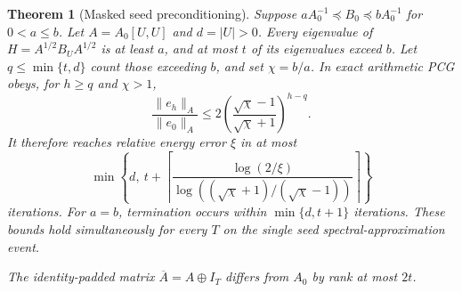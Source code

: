 \documentclass[11pt]{article}
\newtheorem{theorem}{Theorem}
\begin{document}
\begin{theorem}[Masked seed preconditioning]\label{thm:seedpcg}
Suppose $aA_0^{-1}\preceq B_0\preceq bA_0^{-1}$ for $0<a\leq b$.
Let $A=A_0[U,U]$ and $d=|U|>0$. Every eigenvalue of
$H=A^{1/2}B_UA^{1/2}$ is at least $a$, and at most $t$ of its
eigenvalues exceed $b$. Let $q\leq\min\{t,d\}$ count those
exceeding $b$, and set $\chi=b/a$. In exact arithmetic PCG obeys,
for $h\geq q$ and $\chi>1$,
\[
 \frac{\|e_h\|_A}{\|e_0\|_A}
 \leq 2\left(\frac{\sqrt\chi-1}{\sqrt\chi+1}\right)^{h-q}.
\]
It therefore reaches relative energy error $\xi$ in at most
\[
 \min\left\{d,\ t+
 \left\lceil\frac{\log(2/\xi)}{
 \log((\sqrt\chi+1)/(\sqrt\chi-1))}\right\rceil\right\}
\]
iterations. For $a=b$, termination occurs within $\min\{d,t+1\}$
iterations. These bounds hold simultaneously for every $T$ on the
single seed spectral-approximation event.

The identity-padded matrix $\overline A=A\oplus I_T$ differs from
$A_0$ by rank at most $2t$.
\end{theorem}
\end{document}
